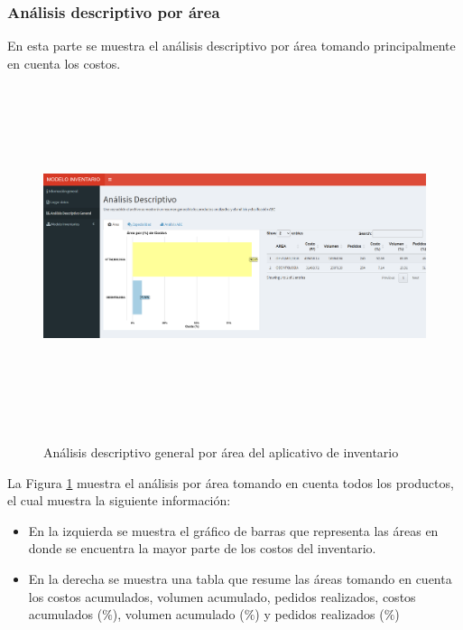 \subsubsection{Análisis descriptivo por área}
En esta parte se muestra el análisis descriptivo por área tomando principalmente en cuenta los costos.

\begin{figure}[H]
  \caption{Análisis descriptivo general por área del aplicativo de inventario}
  {\includegraphics[width=16cm, height=10cm]{images/Shiny3.png}}
  \label{fig:Shiny3}
\end{figure}

La Figura \ref{fig:Shiny3} muestra el análisis por área tomando en cuenta todos los productos, el cual muestra la siguiente información:

\begin{itemize}
  \item En la izquierda se muestra el gráfico de barras que representa las áreas en donde se encuentra la mayor parte de los costos del inventario.
  \item En la derecha se muestra una tabla que resume las áreas tomando en cuenta los costos acumulados, volumen acumulado, pedidos realizados, costos acumulados ($\%$), volumen acumulado ($\%$) y pedidos realizados ($\%$)
\end{itemize}

